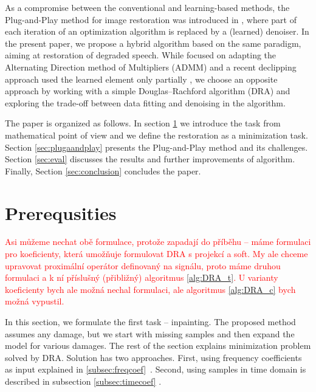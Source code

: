 \documentclass[conference]{IEEEtran}
\newcommand{\todo}[1]{\textcolor{red}{#1}}
\begin{document}
As a compromise between the conventional and learning-based methods, 
the Plug-and-Play method for image restoration was introduced in \cite{Chan2016},
where part of each iteration of an optimization algorithm is replaced by a (learned) denoiser.
In the present paper, we propose a hybrid algorithm based on the same paradigm, aiming at restoration of degraded speech.
While \cite{Chan2016} focused on adapting the Alternating Direction method of Multipliers (ADMM) and a recent declipping approach used the learned element only partially \cite{Tanaka2022}, we choose an opposite approach by working with a simple Douglas--Rachford algorithm (DRA) and exploring the trade-off between data fitting and denoising in the algorithm.



The paper is organized as follows. In section \ref{sec:prereq} we introduce the task from mathematical point of view and we define the restoration as a minimization task.
Section \ref{sec:plugaandplay} presents the Plug-and-Play method and its challenges.
Section \ref{sec:eval} discusses the results and further improvements of algorithm.
Finally, Section \ref{sec:conclusion} concludes the paper.

\section{Prerequsities}\label{sec:prereq} 

\todo{Asi můžeme nechat obě formulace, protože zapadají do příběhu -- máme formulaci pro koeficienty, která umožňuje formulovat DRA s projekcí a soft. My ale chceme upravovat proximální operátor definovaný na signálu, proto máme druhou formulaci a k ní příslušný (přibližný) algoritmus \ref{alg:DRA_t}.
U varianty koeficienty bych ale možná nechal formulaci, ale algoritmus \ref{alg:DRA_c} bych možná vypustil.}

In this section, we formulate the first task -- inpainting.
The proposed method \cite{Chan2016} assumes any damage,
but we start with missing samples and then expand the model for various damages.
The rest of the section explains minimization problem solved by DRA.
Solution has two approaches.
First, using frequency coefficients as input explained in \ref{subsec:freqcoef}~\cite{Mokry2020}.
Second, using samples in time domain is described in subsection \ref{subsec:timecoef} \cite{Mokry2021}.
\end{document}
